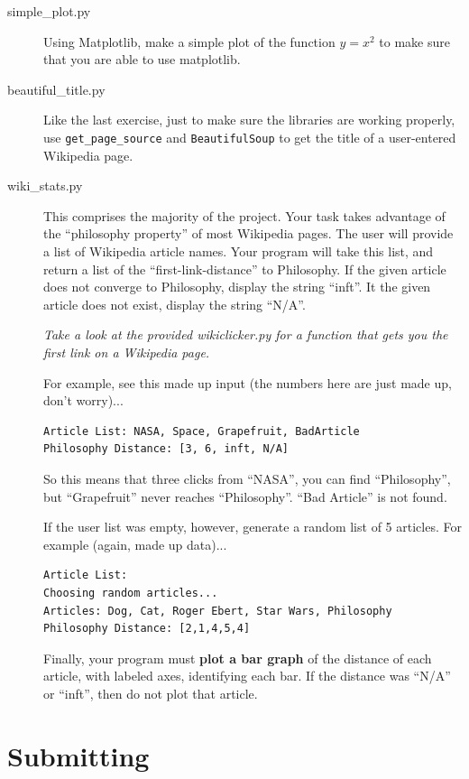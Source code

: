 \documentclass[11pt]{cselabheader}
\begin{document}
\begin{description}
  \item[simple\_plot.py] Using Matplotlib, make a simple plot of the function
    $y = x^2$ to make sure that you are able to use matplotlib.

  \item[beautiful\_title.py] Like the last exercise, just to make sure the
    libraries are working properly, use \texttt{get\_page\_source} and
    \texttt{BeautifulSoup} to get the title of a user-entered Wikipedia page.

  \item[wiki\_stats.py] This comprises the majority of the project. Your task
    takes advantage of the ``philosophy property'' of most Wikipedia pages. The
    user will provide a list of Wikipedia article names. Your program will take
    this list, and return a list of the ``first-link-distance'' to Philosophy.
    If the given article does not converge to Philosophy, display the string
    ``inft''.  It the given article does not exist, display the string ``N/A''.

    \emph{Take a look at the provided wikiclicker.py for a function that gets
    you the first link on a Wikipedia page.}

    For example, see this made up input (the numbers here are just made up, don't
    worry)...
    \begin{lstlisting}[style=bash]
Article List: NASA, Space, Grapefruit, BadArticle
Philosophy Distance: [3, 6, inft, N/A]
    \end{lstlisting}
    So this means that three clicks from ``NASA'', you can find ``Philosophy'',
    but ``Grapefruit'' never reaches ``Philosophy''. ``Bad Article'' is not
    found.

    If the user list was empty, however, generate a random list of 5 articles.
    For example (again, made up data)...
    \begin{lstlisting}[style=bash]
Article List:
Choosing random articles...
Articles: Dog, Cat, Roger Ebert, Star Wars, Philosophy
Philosophy Distance: [2,1,4,5,4]
    \end{lstlisting}

    Finally, your program must \textbf{plot a bar graph} of the distance of each
    article, with labeled axes, identifying each bar. If the distance was
    ``N/A'' or ``inft'', then do not plot that article.
\end{description}

\pagebreak
\section{Submitting}
\end{document}
